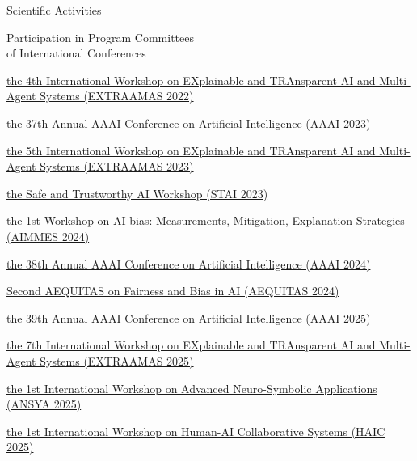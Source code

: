 \documentclass{resume} %
\begin{document}
\begin{rSection}{Scientific Activities}
        \begin{rSubsection2}{Participation in Program Committees\\ of International Conferences}
            \item \href{https://extraamas.ehealth.hevs.ch/archive.html#organizations-2022}{the 4th International Workshop on EXplainable and TRAnsparent AI and Multi-Agent Systems (EXTRAAMAS 2022)}
            \item \href{https://apice.unibo.it/xwiki/bin/view/Event/Aaai2023}{the 37th Annual AAAI Conference on Artificial Intelligence (AAAI 2023)}
            \item \href{https://apice.unibo.it/xwiki/bin/view/Event/Prima2023}{the 5th International Workshop on EXplainable and TRAnsparent AI and Multi-Agent Systems (EXTRAAMAS 2023)}
            \item \href{https://web.archive.org/web/20240225110652/https://www.stai.uk/stai-23-iclp}{the Safe and Trustworthy AI Workshop (STAI 2023)}
            \item \href{https://fairnesscluster.github.io/aimmes23.github.io/index.html}{the 1st Workshop on AI bias: Measurements, Mitigation, Explanation Strategies (AIMMES 2024)}
            \item \href{https://apice.unibo.it/xwiki/bin/view/Event/Aaai2024}{the 38th Annual AAAI Conference on Artificial Intelligence (AAAI 2024)}
            \item \href{https://aequitas-aod.github.io/aequitas-ecai24.github.io/pc-member.html}{Second AEQUITAS on Fairness and Bias in AI (AEQUITAS 2024)}
            \item \href{https://aaai.org/conference/aaai/aaai-25/}{the 39th Annual AAAI Conference on Artificial Intelligence (AAAI 2025)}
            \item \href{https://extraamas.ehealth.hevs.ch/index.html}{the 7th International Workshop on EXplainable and TRAnsparent AI and Multi-Agent Systems (EXTRAAMAS 2025)}
            \item \href{https://ansya-workshop.github.io/2025}{the 1st International Workshop on Advanced Neuro-Symbolic Applications (ANSYA 2025)}
            \item \href{https://haic-workshop.github.io/haic.github.io}{the 1st International Workshop on Human-AI Collaborative Systems (HAIC 2025)}
        \end{rSubsection2}


\end{rSection}
\end{document}
